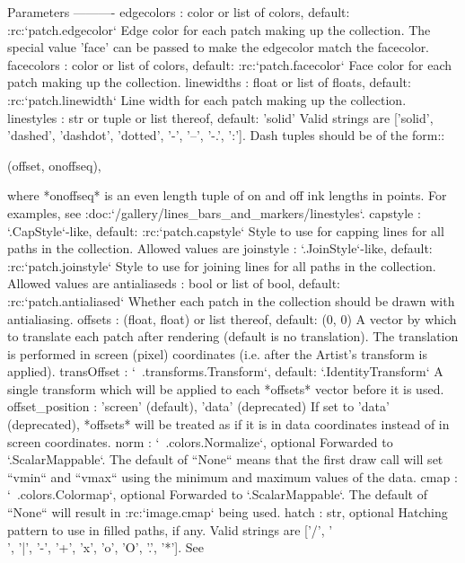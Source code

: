 \begin{DoxyVerb}Parameters
----------
edgecolors : color or list of colors, default: :rc:`patch.edgecolor`
    Edge color for each patch making up the collection. The special
    value 'face' can be passed to make the edgecolor match the
    facecolor.
facecolors : color or list of colors, default: :rc:`patch.facecolor`
    Face color for each patch making up the collection.
linewidths : float or list of floats, default: :rc:`patch.linewidth`
    Line width for each patch making up the collection.
linestyles : str or tuple or list thereof, default: 'solid'
    Valid strings are ['solid', 'dashed', 'dashdot', 'dotted', '-',
    '--', '-.', ':']. Dash tuples should be of the form::

(offset, onoffseq),

    where *onoffseq* is an even length tuple of on and off ink lengths
    in points. For examples, see
    :doc:`/gallery/lines_bars_and_markers/linestyles`.
capstyle : `.CapStyle`-like, default: :rc:`patch.capstyle`
    Style to use for capping lines for all paths in the collection.
    Allowed values are %
joinstyle : `.JoinStyle`-like, default: :rc:`patch.joinstyle`
    Style to use for joining lines for all paths in the collection.
    Allowed values are %
antialiaseds : bool or list of bool, default: :rc:`patch.antialiased`
    Whether each patch in the collection should be drawn with
    antialiasing.
offsets : (float, float) or list thereof, default: (0, 0)
    A vector by which to translate each patch after rendering (default
    is no translation). The translation is performed in screen (pixel)
    coordinates (i.e. after the Artist's transform is applied).
transOffset : `~.transforms.Transform`, default: `.IdentityTransform`
    A single transform which will be applied to each *offsets* vector
    before it is used.
offset_position : {{'screen' (default), 'data' (deprecated)}}
    If set to 'data' (deprecated), *offsets* will be treated as if it
    is in data coordinates instead of in screen coordinates.
norm : `~.colors.Normalize`, optional
    Forwarded to `.ScalarMappable`. The default of
    ``None`` means that the first draw call will set ``vmin`` and
    ``vmax`` using the minimum and maximum values of the data.
cmap : `~.colors.Colormap`, optional
    Forwarded to `.ScalarMappable`. The default of
    ``None`` will result in :rc:`image.cmap` being used.
hatch : str, optional
    Hatching pattern to use in filled paths, if any. Valid strings are
    ['/', '\\', '|', '-', '+', 'x', 'o', 'O', '.', '*']. See

\end{DoxyVerb}
